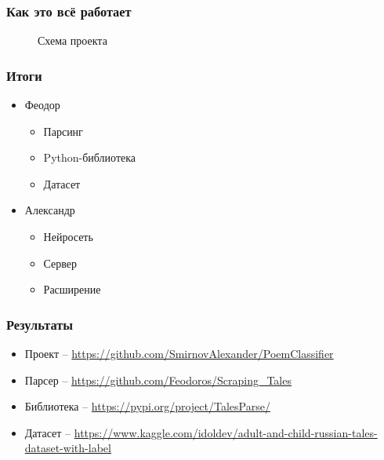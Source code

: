 \documentclass[xetex,mathserif,serif]{beamer}
\begin{document}
	\begin{frame}
		\frametitle{Как это всё работает}
		\begin{figure}[h]
            \caption{Схема проекта}
            \label{fig:image}
        \end{figure}
	\end{frame}	
	
	\begin{frame}
		\frametitle{Итоги}
		\begin{itemize}
			\item Феодор
			    \begin{itemize}
			    	\item Парсинг
			    	\item Python-библиотека
			    	\item Датасет
		        \end{itemize}
			\item Александр
			    \begin{itemize}
			    	\item Нейросеть
			    	\item Сервер
			    	\item Расширение
		        \end{itemize}
		\end{itemize}
	\end{frame}
	
	\begin{frame}
		\frametitle{Результаты}
		\begin{itemize}
			\item Проект – \url{https://github.com/SmirnovAlexander/PoemClassifier}
			\item Парсер – \url{https://github.com/Feodoros/Scraping_Tales}
			\item Библиотека – \url{https://pypi.org/project/TalesParse/}
			\item Датасет – \url{https://www.kaggle.com/idoldev/adult-and-child-russian-tales-dataset-with-label}
		\end{itemize}
	\end{frame}
\end{document}
